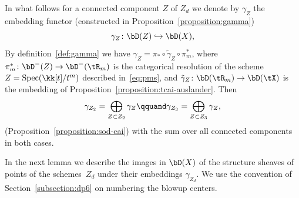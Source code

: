 \documentclass[11pt]{amsart}
\DeclareMathOperator{\Spec}{\mathrm{Spec}}
\theoremstyle{plain}
\theoremstyle{definition}
\theoremstyle{remark}
\begin{document}
In what follows for a connected component $Z$ of $Z_d$ we denote by $\gamma_Z$ the embedding functor 
(constructed in Proposition~\ref{proposition:gamma})
\begin{equation*}
\gamma_Z \colon \bD(Z) \hookrightarrow \bD(X),
\end{equation*}
By definition~\eqref{def:gamma} we have $\gamma_Z = \pi_* \circ \tilde\gamma_Z \circ \pi_m^*$, 
where $\pi_m^* \colon \bD^-(Z) \to \bD^-(\tR_m)$ is the categorical resolution of the scheme $Z = \Spec(\kk[t]/t^m)$ described in~\eqref{eq:pms}, 
and $\tilde\gamma_Z \colon \bD(\tR_m) \to \bD(\tX)$ is the embedding of Proposition~\ref{proposition:tcai-auslander}.
Then 
\begin{equation*}
\gamma_{Z_2} = \bigoplus_{Z \subset Z_2} \gamma_Z
\qquand 
\gamma_{Z_3} = \bigoplus_{Z \subset Z_3} \gamma_Z,
\end{equation*}
(Proposition~\ref{proposition:sod-cai}) with the sum over all connected components in both cases.


In the next lemma we describe the images in $\bD(X)$ of the structure sheaves of points of the schemes~$Z_d$ under their embeddings $\gamma_{Z_d}$.
We use the convention of Section~\ref{subsection:dp6} on numbering the blowup centers.
\end{document}
